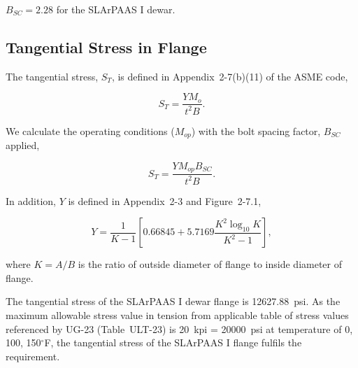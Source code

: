 $B_{SC} = 2.28$ for the SLArPAAS I dewar.

\subsection{Tangential Stress in Flange}
\label{app:tangential_stress}

The tangential stress, $S_T$, is defined in Appendix~2-7(b)(11) of the
ASME code,

\begin{equation}
    S_T = \frac{YM_o}{t^2B}.
\end{equation}


We calculate the operating conditions ($M_{op}$) with the bolt spacing 
factor, $B_{SC}$ applied,

\begin{equation}
    S_T = \frac{YM_{op}B_{SC}}{t^2B}.
\end{equation}

In addition, $Y$ is defined in Appendix~2-3 and Figure~2-7.1,

\begin{equation}
    Y = \frac{1}{K-1}[0.66845+5.7169\frac{K^2\log_{10}K}{K^2-1}],
\end{equation}

where $K = A/B$ is the ratio of outside diameter of flange to 
inside diameter of flange.

The tangential stress of the SLArPAAS I dewar flange is 12627.88~psi.
As the maximum allowable stress value in tension from applicable table
of stress values referenced by UG-23 (Table~ULT-23)
is 20~kpi = 20000~psi at temperature of 0, 100, 150$^{\circ}$F,
the tangential stress of the SLArPAAS I flange fulfils the requirement.

